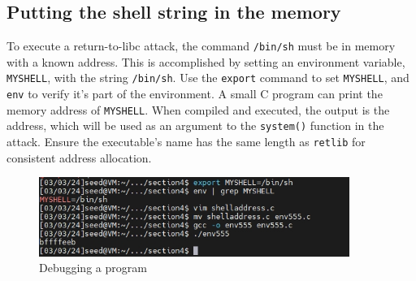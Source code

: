 \documentclass[a4paper,11pt]{article}
\begin{document}
\subsection{Putting the shell string in the memory}
To execute a return-to-libc attack, the command \verb|/bin/sh| must be in memory with a known address. This is accomplished by setting an environment variable, \verb|MYSHELL|, with the string \verb|/bin/sh|. Use the \verb|export| command to set \verb|MYSHELL|, and \verb|env| to verify it's part of the environment. A small C program can print the memory address of \verb|MYSHELL|. When compiled and executed, the output is the address, which will be used as an argument to the \verb|system()| function in the attack. Ensure the executable's name has the same length as  \verb|retlib| for consistent address allocation.
\begin{figure}[h]
    \centering
       \includegraphics[width=0.9\textwidth]{figures/task18/task18.png}
    \caption{Debugging a program}\label{fig:task18}
\end{figure}
\end{document}
